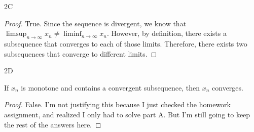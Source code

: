\documentclass[boxes]{rutgers_hw}
\begin{document}
\begin{exern}{2}
\begin{exern}{2C}
    \end{exern}

    \begin{proof}
        
        True. Since the sequence is divergent, we know that $\limsup_{n\to\infty} x_n \neq \liminf_{n\to\infty} x_n$.
        However, by definition, there exists a subsequence that converges to each of those limits.
        Therefore, there exists two subsequences that converge to different limits.

    \end{proof}


    \begin{exern}{2D}

        If $x_n$ is monotone and contains a convergent subsequence, then $x_n$ converges.
    
    \end{exern}

    \begin{proof}
        
        False. I'm not justifying this because I just checked the homework assignment, and realized I only had to solve part A.
        But I'm still going to keep the rest of the answers here.

    \end{proof}

  \end{exern}
\end{document}
